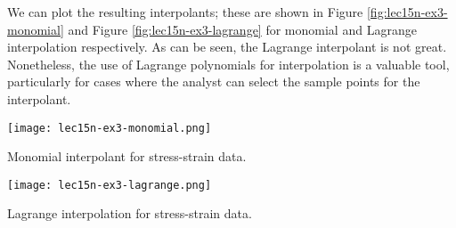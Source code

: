 We can plot the resulting interpolants; these are shown in Figure \ref{fig:lec15n-ex3-monomial} and Figure \ref{fig:lec15n-ex3-lagrange} for monomial and Lagrange interpolation respectively.  As can be seen, the Lagrange interpolant is not great.  Nonetheless, the use of Lagrange polynomials for interpolation is a valuable tool, particularly for cases where the analyst can select the sample points for the interpolant.
\begin{marginfigure}
\texttt{[image: lec15n-ex3-monomial.png]}
\caption{Monomial interpolant for stress-strain data.}
\label{fig:lec15n-ex3-monomial}
\end{marginfigure}

\begin{marginfigure}
\texttt{[image: lec15n-ex3-lagrange.png]}
\caption{Lagrange interpolation for stress-strain data.}
\label{fig:lec15n-ex3-lagrange}
\end{marginfigure}


